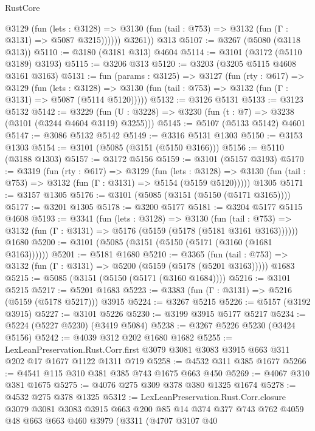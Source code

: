 \begin{lexlean}{RustCore}
\begin{coremodule}
            @3129
              (fun (lets : @3128) =>
              @3130 (fun (tail : @753) => @3132 (fun (Γ : @3131) => @5087 @3215))))))
        @3261))
    @313
@5107 := @3267 (@5080 (@3118 @313))
@5110 := @3180 (@3181 @313) @4604
@5114 := @3101 (@3172 (@5110 @3189) @3193)
@5115 := @3206 @313
@5120 := @3203 (@3205 @5115 @4608 @3161 @3163)
@5131 := fun (params : @3125) =>
  @3127
    (fun (rty : @617) =>
    @3129
      (fun (lets : @3128) =>
      @3130 (fun (tail : @753) => @3132 (fun (Γ : @3131) => @5087 (@5114 @5120)))))
@5132 := @3126 @5131
@5133 := @3123 @5132
@5142 := @3229 (fun (U : @3228) => @3230 (fun (t : @7) => @3238 (@3101 (@3244 @4604 @3119) @3255)))
@5145 := @5107 (@5133 @5142) @4601
@5147 := @3086 @5132 @5142
@5149 := @3316 @5131 @1303
@5150 := @3153 @1303
@5154 := @3101 (@5085 (@3151 (@5150 @3166)))
@5156 := @5110 (@3188 @1303)
@5157 := @3172 @5156
@5159 := @3101 (@5157 @3193)
@5170 := @3319
    (fun (rty : @617) =>
    @3129
      (fun (lets : @3128) =>
      @3130 (fun (tail : @753) => @3132 (fun (Γ : @3131) => @5154 (@5159 @5120)))))
    @1305
@5171 := @3157 @1305
@5176 := @3101 (@5085 (@3151 (@5150 (@5171 @3165))))
@5177 := @3201 @1305
@5178 := @3200 @5177
@5181 := @3204 @5177 @5115 @4608
@5193 := @3341
    (fun (lets : @3128) =>
    @3130
      (fun (tail : @753) => @3132 (fun (Γ : @3131) => @5176 (@5159 (@5178 (@5181 @3161 @3163))))))
    @1680
@5200 := @3101 (@5085 (@3151 (@5150 (@5171 (@3160 (@1681 @3163))))))
@5201 := @5181 @1680
@5210 := @3365
    (fun (tail : @753) => @3132 (fun (Γ : @3131) => @5200 (@5159 (@5178 (@5201 @3163)))))
    @1683
@5215 := @5085 (@3151 (@5150 (@5171 (@3160 @1684))))
@5216 := @3101 @5215
@5217 := @5201 @1683
@5223 := @3383 (fun (Γ : @3131) => @5216 (@5159 (@5178 @5217))) @3915
@5224 := @3267 @5215
@5226 := @5157 (@3192 @3915)
@5227 := @3101 @5226
@5230 := @3199 @3915 @5177 @5217
@5234 := @5224 (@5227 @5230) (@3419 @5084)
@5238 := @3267 @5226 @5230 (@3424 @5156)
@5242 := @4039 @312 @202 @1680 @1682
@5255 := LexLeanPreservation.Rust.Corr.first
    @3079
    @3081
    @3083
    @3915
    @663
    @311
    @202
    @17
    @1677
    @1122
    @1311
    @719
@5258 := @4532 @311 @385 @1677
@5266 := @4541 @115 @310 @381 @385 @743 @1675 @663 @450
@5269 := @4067 @310 @381 @1675
@5275 := @4076 @275 @309 @378 @380 @1325 @1674
@5278 := @4532 @275 @378 @1325
@5312 := LexLeanPreservation.Rust.Corr.closure
    @3079
    @3081
    @3083
    @3915
    @663
    @200
    @85
    @14
    @374
    @377
    @743
    @762
    @4059
    @48
    @663
    @663
    @460
    @3979
    (@3311
      (@4707
        @3107
        @40

\end{coremodule}
\end{lexlean}
